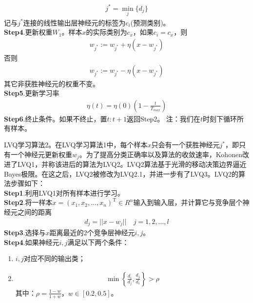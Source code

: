 {\begin{align*}
            j^* = \min _j\{d_j\}
            \end{align*}
            记与$j^*$连接的线性输出层神经元的标签为$c_i$(预测类别)。\\
            \textbf{Step4}.更新权重$W_1$。样本$x$的实际类别为$c_x$，如果$c_i = c_x$，则
            \begin{align*}
            w_{j^*}:=w_{j^*}+\eta(x-w_{j^*})
            \end{align*}
            否则
            \begin{align*}
            w_{j^*}:=w_{j^*}-\eta(x-w_{j^*})
            \end{align*}
            其它非获胜神经元的权重不变。\\
            \textbf{Step5}.更新学习率
            \begin{align*}
            \eta(t) = \eta(0) \left( 1-\frac{t}{T_{max}} \right)
            \end{align*}
            \textbf{Step6}.终止条件。如果不终止，置$t:t+1$返回Step2。
            注：我们在$t$时刻下循环所有样本。
            \par
            LVQ学习算法2。在LVQ学习算法1中，每个样本$x$只会有一个获胜神经元$j^*$，即只有一个神经元更新权重$w_j$。为了提高分类正确率以及算法的收敛速率，Kohonen改进了LVQ1，并称该进后的算法为LVQ2。LVQ2算法基于光滑的移动决策边界逼近Bayes极限。在这之后，LVQ2被修改为LVQ2.1，并进一步有了LVQ3。LVQ2的算法步骤如下：\\
            \textbf{Step1}.利用LVQ1对所有样本进行学习。\\
            \textbf{Step2}.将一样本$x = (x_1,x_2,\dots,x_n)^\mathrm{T}\in R^n$输入到输入层，并计算它与竞争层个神经元之间的距离
            \begin{align*}
            d_j = ||x-w_j||\quad j=1,2,\dots,l
            \end{align*}
            \textbf{Step3}.选择与$x$距离最近的2个竞争层神经元$i,j$。\\
            \textbf{Step4}.如果神经元$i,j$满足以下两个条件：
            \begin{enumerate}
            \item $i,j$对应不同的输出类；
            \item
            \begin{align*}
            \min \left\{ \frac{d_i}{d_j} ,\frac{d_j}{d_i} \right\} > \rho
            \end{align*}
            其中：$\rho = \frac{1-w}{1+w}$，$w\in [0.2,0.5]$。
            \end{enumerate}
}
